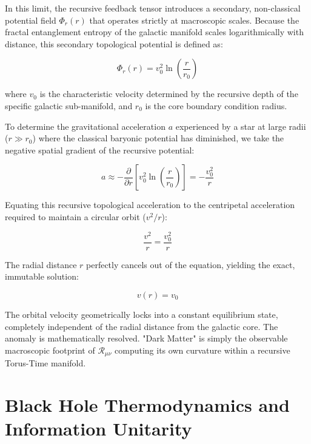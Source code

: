 \documentclass[12pt,openany]{book}
\begin{document}
In this limit, the recursive feedback tensor introduces a secondary, non-classical potential field $\Phi_r(r)$ that operates strictly at macroscopic scales. Because the fractal entanglement entropy of the galactic manifold scales logarithmically with distance, this secondary topological potential is defined as:

\begin{equation}
\Phi_r(r) = v_0^2 \ln\left(\frac{r}{r_0}\right)
\end{equation}

where $v_0$ is the characteristic velocity determined by the recursive depth of the specific galactic sub-manifold, and $r_0$ is the core boundary condition radius. 

To determine the gravitational acceleration $a$ experienced by a star at large radii ($r \gg r_0$) where the classical baryonic potential has diminished, we take the negative spatial gradient of the recursive potential:

\begin{equation}
a \approx -\frac{\partial}{\partial r} \left[ v_0^2 \ln\left(\frac{r}{r_0}\right) \right] = -\frac{v_0^2}{r}
\end{equation}

Equating this recursive topological acceleration to the centripetal acceleration required to maintain a circular orbit ($v^2/r$):

\begin{equation}
\frac{v^2}{r} = \frac{v_0^2}{r}
\end{equation}

The radial distance $r$ perfectly cancels out of the equation, yielding the exact, immutable solution:

\begin{equation}
v(r) = v_0
\end{equation}

The orbital velocity geometrically locks into a constant equilibrium state, completely independent of the radial distance from the galactic core. The anomaly is mathematically resolved. "Dark Matter" is simply the observable macroscopic footprint of $\mathcal{R}_{\mu\nu}$ computing its own curvature within a recursive Torus-Time manifold.

\chapter{Black Hole Thermodynamics and Information Unitarity}
\end{document}
